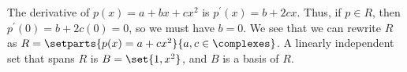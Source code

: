 The derivative of $p(x) = a + bx + cx^2$ is $p^\prime(x) = b + 2cx$.  
Thus, if $p \in R$, then $p^\prime(0) = b + 2c(0) = 0$, 
so we must have $b = 0$.  We see that we can rewrite $R$ as 
$R = \setparts{p(x) = a + cx^2}{a, c\in\complexes}$.
A linearly independent set that spans $R$ is $B = \set{1,x^2}$, and $B$ is a basis of $R$. 


